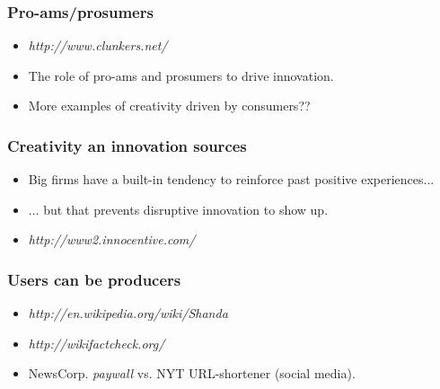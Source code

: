 \documentclass{beamer}
\begin{document}

\begin{frame}
 \frametitle{Pro-ams/prosumers}
 \begin{itemize}
  \item \textit{http://www.clunkers.net/}
  \item The role of pro-ams and prosumers to drive innovation.
  \item More examples of creativity driven by consumers??
 \end{itemize}


\end{frame}


\begin{frame}
 \frametitle{Creativity an innovation sources}
 \begin{itemize}
  \item Big firms have a built-in tendency to reinforce past positive experiences...
  \item ... but that prevents disruptive innovation to show up.
  \item \textit{http://www2.innocentive.com/}
 \end{itemize}

\end{frame}


\begin{frame}
 \frametitle{Users can be producers}
 \begin{itemize}
  \item \textit{http://en.wikipedia.org/wiki/Shanda}
  \item \textit{http://wikifactcheck.org/}
  \item NewsCorp. \textit{paywall} vs. NYT URL-shortener (social media).
 \end{itemize}

\end{frame}
\end{document}
